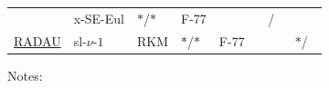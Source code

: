 \documentclass[]{book}
\theoremstyle{definition}
\theoremstyle{definition}
\theoremstyle{definition}
\theoremstyle{definition}
\theoremstyle{remark}
\begin{document}
\begin{longtable}[]{@{}llllllc@{}}
\begin{minipage}[t]{0.06\columnwidth}
\end{minipage} & \begin{minipage}[t]{0.10\columnwidth}\raggedright
x-SE-Eul\strut
\end{minipage} & \begin{minipage}[t]{0.05\columnwidth}\raggedright
\(*\)/\(*\)\strut
\end{minipage} & \begin{minipage}[t]{0.06\columnwidth}\raggedright
F-77\strut
\end{minipage} & \begin{minipage}[t]{0.41\columnwidth}\raggedright
\strut
\end{minipage} & \begin{minipage}[t]{0.05\columnwidth}\centering
\(\phantom{*}\)/\(\phantom{\cdot}\)\strut
\end{minipage}\tabularnewline
\begin{minipage}[t]{0.06\columnwidth}\raggedright
\href{http://www.unige.ch/~hairer/prog/stiff/radau.f}{RADAU}\strut
\end{minipage} & \begin{minipage}[t]{0.06\columnwidth}\raggedright
sl-\(\nu\)-\(1\)\strut
\end{minipage} & \begin{minipage}[t]{0.10\columnwidth}\raggedright
RKM\strut
\end{minipage} & \begin{minipage}[t]{0.05\columnwidth}\raggedright
\(*\)/\(*\)\strut
\end{minipage} & \begin{minipage}[t]{0.06\columnwidth}\raggedright
F-77\strut
\end{minipage} & \begin{minipage}[t]{0.41\columnwidth}\raggedright
\strut
\end{minipage} & \begin{minipage}[t]{0.05\columnwidth}\centering
\(*\)/\(\phantom{\cdot}\)\strut
\end{minipage}\tabularnewline
\bottomrule
\end{longtable}

Notes:
\end{document}
